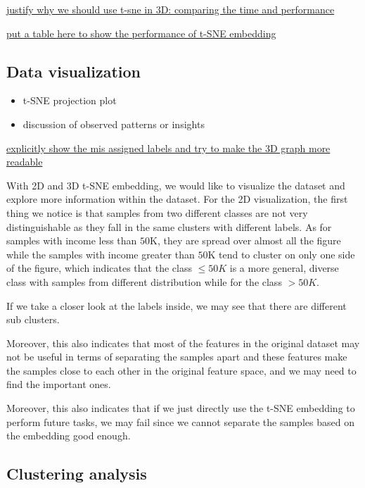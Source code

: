 \documentclass{article}
\begin{document}


\underline{justify why we should use t-sne in 3D: comparing the time and performance}

\underline{put a table here to show the performance of t-SNE embedding}


\subsection{Data visualization}

\begin{itemize}
    \item t-SNE projection plot
    \item discussion of observed patterns or insights
\end{itemize}

\underline{explicitly show the mis assigned labels and try to make the 3D graph more readable}



With 2D and 3D t-SNE embedding, we would like to visualize the dataset and explore more information within the dataset. For the 2D visualization, the first thing we notice is that samples from two different classes are not very distinguishable as they fall in the same clusters with different labels. As for samples with income less than $50$K, they are spread over almost all the figure while the samples with income greater than $50$K tend to cluster on only one side of the
figure, which indicates that the class $\le 50K$ is a more general, diverse class with samples from different distribution while for the class $>50K$. 

If we take a closer look at the labels inside, we may see that there are different sub clusters.

Moreover, this also indicates that most of the features in the original dataset may not be useful in terms of separating the samples apart and these features make the samples close to each other in the original feature space, and we may need to find the important ones.

Moreover, this also indicates that if we just directly use the t-SNE embedding to perform future tasks, we may fail since we cannot separate the samples based on the embedding good enough.

\subsection{Clustering analysis}
\end{document}

